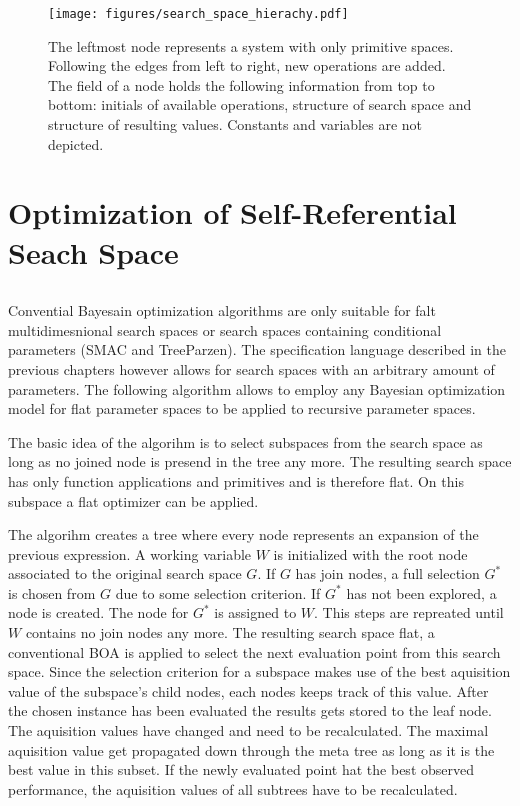 \documentclass[english]{article}
\begin{document}
\begin{figure}
\texttt{[image: figures/search\_space\_hierachy.pdf]}

  \caption{The leftmost node represents a system with only primitive spaces. Following the edges from left to right, new operations are added. The field of a node holds the following information from top to bottom: initials of available operations, structure of search space and structure of resulting values. Constants and variables are not depicted.}
  \label{space_structure}
\end{figure}


\section{Optimization of Self-Referential Seach Space}

\subsection{}
Convential Bayesain optimization algorithms are only suitable for falt multidimesnional search spaces or search spaces containing conditional parameters (SMAC and TreeParzen). The specification language described in the previous chapters however allows for search spaces with an arbitrary amount of parameters. The following algorithm allows to employ any Bayesian optimization model for flat parameter spaces to be applied to recursive parameter spaces.

The basic idea of the algorihm is to select subspaces from the search space as long as no joined node is presend in the tree any more. The resulting search space has only function applications and primitives and is therefore flat. On this subspace a flat optimizer can be applied.

The algorihm creates a tree where every node represents an expansion of the previous expression. A working variable $W$ is initialized with the root node associated to the original search space $G$. If $G$ has join nodes, a full selection $G^*$ is chosen from $G$ due to some selection criterion. If $G^*$ has not been explored, a node is created. The node for $G^*$ is assigned to $W$. This steps are repreated until $W$ contains no join nodes any more. The resulting search space flat, a conventional \ac{BOA} is applied to select the next evaluation point from this search space. Since the selection criterion for a subspace makes use of the best aquisition value of the subspace's child nodes, each nodes keeps track of this value. After the chosen instance has been evaluated the results gets stored to the leaf node. The aquisition values have changed and need to be recalculated. The maximal aquisition value get propagated down through the meta tree as long as it is the best value in this subset. If the newly evaluated point hat the best observed performance, the aquisition values of all subtrees have to be recalculated.
\end{document}
